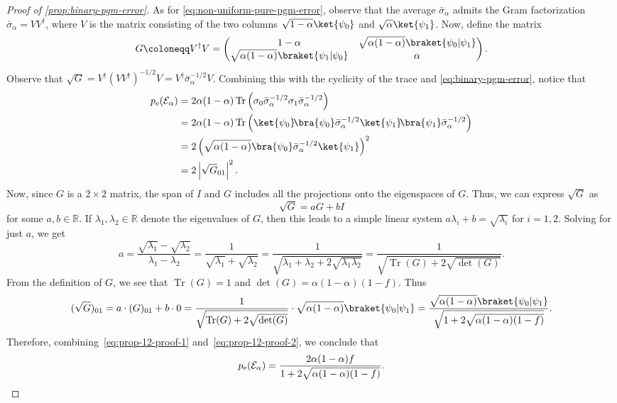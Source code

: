 \documentclass[11pt]{article}
\theoremstyle{remark}
\newcommand{\ketbra}[2]{\ket{#1}\!\bra{#2}}
\newcommand{\cE}{\mathcal{E}}
\newcommand{\Tr}{\operatorname{Tr}}
\newcommand{\abs}[1]{\left|#1\right|}
\begin{document}
\begin{proof}[Proof of \cref{prop:binary-pgm-error}]
As for \eqref{eq:non-uniform-pure-pgm-error}, observe that the average $\bar{\sigma}_\alpha$ admits the Gram factorization $\bar{\sigma}_\alpha = VV^\dagger$, where $V$ is the matrix consisting of the two columns $\sqrt{1-\alpha}\ket{\psi_0}$ and $\sqrt{\alpha}\ket{\psi_1}$. Now, define the matrix
\begin{equation*}
G
\coloneqq
V^\dagger V = 
\begin{pmatrix}
1-\alpha & \sqrt{\alpha(1-\alpha)}\braket{\psi_0|\psi_1} \\
\sqrt{\alpha(1-\alpha)}\braket{\psi_1|\psi_0} & \alpha
\end{pmatrix}.
\end{equation*}
Observe that $\sqrt{G} = V^\dagger(VV^\dagger)^{-1/2}V = V^\dagger \bar{\sigma}_\alpha^{-1/2} V$. Combining this with the cyclicity of the trace and \eqref{eq:binary-pgm-error}, notice that
\begin{align}
p_{\mathrm{e}}(\cE_\alpha) &= 2\alpha(1-\alpha)\Tr\left(\sigma_0\bar{\sigma}_\alpha^{-1/2}\sigma_1\bar{\sigma}_\alpha^{-1/2}\right) \notag \\
&= 2\alpha(1-\alpha)\Tr\left(\ketbra{\psi_0}{\psi_0}\bar{\sigma}_\alpha^{-1/2}\ketbra{\psi_1}{\psi_1}\bar{\sigma}_\alpha^{-1/2}\right) \notag \\
&= 2\left(\sqrt{\alpha(1-\alpha)}\bra{\psi_0}\bar{\sigma}_\alpha^{-1/2}\ket{\psi_1}\right)^2 \notag \\
&= 2\abs{\sqrt{G}_{01}}^2. \label{eq:prop-12-proof-1}
\end{align}
Now, since $G$ is a $2 \times 2$ matrix, the span of $I$ and $G$ includes all the projections onto the eigenspaces of $G$. Thus, we can express $\sqrt{G}$ as
\begin{equation*}
\sqrt{G} = aG + bI
\end{equation*}
for some $a,b \in \mathbb{R}$. If $\lambda_1,\lambda_2 \in \mathbb{R}$ denote the eigenvalues of $G$, then this leads to a simple linear system $a\lambda_i + b = \sqrt{\lambda_i}$ for $i = 1,2$. Solving for just $a$, we get
\begin{equation*}
a = \frac{\sqrt{\lambda_1} - \sqrt{\lambda_2}}{\lambda_1 - \lambda_2} = \frac{1}{\sqrt{\lambda_1} + \sqrt{\lambda_2}} = \frac{1}{\sqrt{\lambda_1 + \lambda_2 + 2\sqrt{\lambda_1\lambda_2}}} = \frac{1}{\sqrt{\Tr(G) + 2\sqrt{\det(G)}}}.
\end{equation*}
From the definition of $G$, we see that $\Tr(G) = 1$ and $\det(G) = \alpha(1-\alpha)(1-f)$. Thus
\begin{equation}
(\sqrt{G})_{01}
= a \cdot (G)_{01} + b \cdot 0
= \frac{1}{\sqrt{\Tr(G) + 2\sqrt{\det(G)}}} \cdot \sqrt{\alpha(1-\alpha)}\braket{\psi_0|\psi_1}
= \frac{\sqrt{\alpha(1-\alpha)}\braket{\psi_0|\psi_1}}
{\sqrt{1+2\sqrt{\alpha(1-\alpha)(1-f)}}}. \label{eq:prop-12-proof-2}
\end{equation}
Therefore, combining~\eqref{eq:prop-12-proof-1} and~\eqref{eq:prop-12-proof-2}, we conclude that
\begin{equation*}
p_{\mathrm{e}}(\cE_\alpha)
= \frac{2\alpha(1-\alpha)f}{1+2\sqrt{\alpha(1-\alpha)(1-f)}}.
\qedhere
\end{equation*}
\end{proof}
\end{document}
